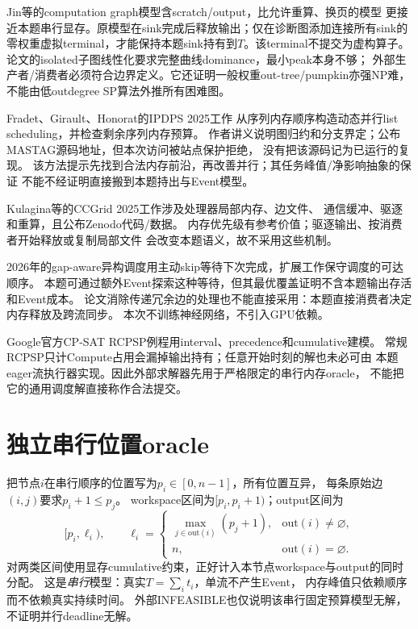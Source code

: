 \documentclass[UTF8,fontset=fandol,11pt]{ctexart}
\begin{document}
Jin等的computation graph模型含scratch/output\cite{dominant}，比允许重算、换页的模型
更接近本题串行显存。原模型在sink完成后释放输出；仅在诊断图添加连接所有sink的
零权重虚拟terminal，才能保持本题sink持有到$T$。该terminal不提交为虚构算子。
论文的isolated子图线性化要求完整曲线dominance，最小peak本身不够；
外部生产者/消费者必须符合边界定义。它还证明一般权重out-tree/pumpkin亦强NP难，
不能由低outdegree SP算法外推所有困难图。

Fradet、Girault、Honorat的IPDPS 2025工作\cite{fradet}
从序列内存顺序构造动态并行list scheduling，并检查剩余序列内存预算。
作者讲义说明图归约和分支界定；公布MASTAG源码地址，但本次访问被站点保护拒绝，
没有把该源码记为已运行的复现。
该方法提示先找到合法内存前沿，再改善并行；其任务峰值/净影响抽象的保证
不能不经证明直接搬到本题持出与Event模型。

Kulagina等的CCGrid 2025工作\cite{adaptive}涉及处理器局部内存、边文件、
通信缓冲、驱逐和重算，且公布Zenodo代码/数据。
内存优先级有参考价值；驱逐输出、按消费者开始释放或复制局部文件
会改变本题语义，故不采用这些机制。

2026年的gap-aware异构调度\cite{gap}用主动skip等待下次完成，扩展工作保守调度的可达顺序。
本题可通过额外Event探索这种等待，但其最优覆盖证明不含本题输出存活和Event成本。
论文消除传递冗余边的处理也不能直接采用：本题直接消费者决定内存释放及跨流同步。
本次不训练神经网络，不引入GPU依赖。

Google官方CP-SAT RCPSP例程\cite{ortools}用interval、precedence和cumulative建模。
常规RCPSP只计Compute占用会漏掉输出持有；任意开始时刻的解也未必可由
本题eager流执行器实现。因此外部求解器先用于严格限定的串行内存oracle，
不能把它的通用调度解直接称作合法提交。

\section{独立串行位置oracle}
把节点$i$在串行顺序的位置写为$p_i\in[0,n-1]$，所有位置互异，
每条原始边$(i,j)$要求$p_i+1\le p_j$。
workspace区间为$[p_i,p_i+1)$；output区间为
\[
 [p_i,\ell_i),\qquad
 \ell_i=\begin{cases}\max_{j\in\mathrm{out}(i)}(p_j+1),&\mathrm{out}(i)\ne\varnothing,\\
 n,&\mathrm{out}(i)=\varnothing.\end{cases}
\]
对两类区间使用显存cumulative约束，正好计入本节点workspace与output的同时分配。
这是\emph{串行}模型：真实$T=\sum_i t_i$，单流不产生Event，
内存峰值只依赖顺序而不依赖真实持续时间。
外部INFEASIBLE也仅说明该串行固定预算模型无解，不证明并行deadline无解。
\end{document}
